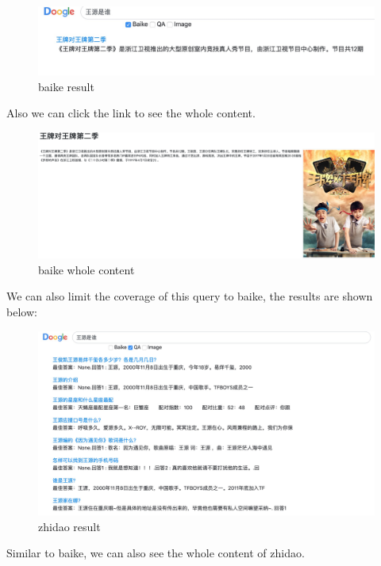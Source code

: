 \documentclass[10pt,times,twocolumn]{article}
\begin{document}
\begin{figure}[ht]
\centering
\includegraphics[scale=0.1]{fig/8}
\caption{baike result}
\label{fig:label}
\end{figure}
\newline
Also we can click the link to see the whole content.
\begin{figure}[ht]
\centering
\includegraphics[scale=0.1]{fig/9}
\caption{baike whole content}
\label{fig:label}
\end{figure}
We can also limit the coverage of this query to baike, the results are shown below:
\begin{figure}[ht]
\centering
\includegraphics[scale=0.13]{fig/10}
\caption{zhidao result}
\label{fig:label}
\end{figure}
\newline
Similar to baike, we can also see the whole content of zhidao.
\end{document}
